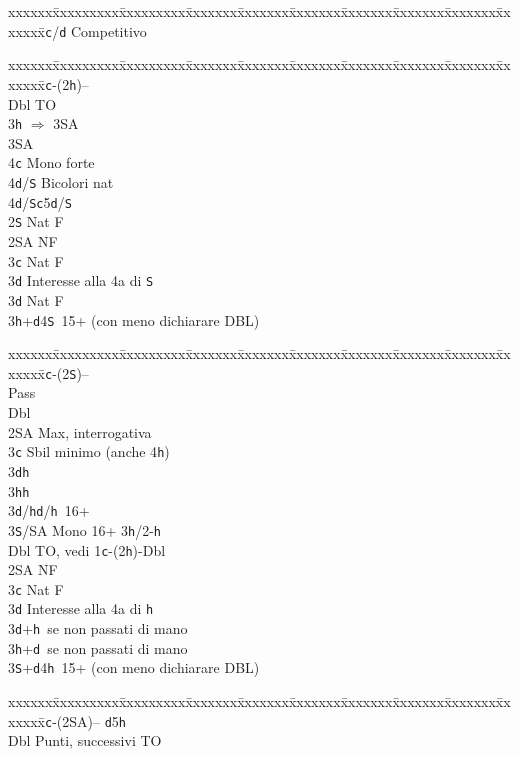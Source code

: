 \documentclass[a4paper,italian]{article}
\newcommand{\BS}{\small{\texttt{S}}}
\newcommand{\BC}{\small{\texttt{c}}}
\newcommand{\BD}{\small{\texttt{d}}}
\newcommand{\BH}{\small{\texttt{h}}}
\newenvironment{bidtable}
{\begin{tabbing}

    xxxxxx\=xxxxxxxxx\=xxxxxxxxx\=xxxxxxx\=xxxxxxx\=xxxxxxx\=xxxxxxx\=xxxxxxx\=xxxxxxx\=xxxxxxx\=\kill}
{\end{tabbing} }%
\begin{document}
\begin{multicols}{2}
\begin{bidtable}
        3\BC/\BD \> Competitivo\-
    \end{bidtable}
    \begin{bidtable}
        1\BC-(2\BH)--\+\\
        Dbl \> TO\+\\
        3\BH\> $\Rightarrow$ 3\small{SA}\+\\
        3\small{SA}\+\\
        4\BC\> Mono forte\\
        4\BD/\BS\> Bicolori nat \-\-\\
        4\BD/\BS{}\BC5\BD/\BS\-\\
        2\BS \> Nat F\\
        2\small{SA} \> NF\\
        3\BC \> Nat F\+\\
        3\BD \> Interesse alla 4a di \BS \-\\
        3\BD \> Nat F\\
        3\BH {}+\BD 4\BS\ 15+ (con meno dichiarare DBL)\-
    \end{bidtable}
    \begin{bidtable}
        1\BC-(2\BS)--\+\\
        Pass\+\\
        Dbl\+\\
        2\small{SA}\> Max, interrogativa\+\\
        3\BC\> Sbil minimo (anche 4\BH)\+\\
        3\BD{}\BH\\
        3\BH{}\BH\-\\
        3\BD/\BH{}\BD/\BH\ 16+\\
        3\BS/SA\> Mono 16+ 3\BH/2-\BH\-\-\-\\
        Dbl \> TO, vedi 1\BC-(2\BH)-Dbl\\
        2\small{SA} \> NF\\
        3\BC \> Nat F\+\\
        3\BD \> Interesse alla 4a di \BH \-\\
        3\BD {}+\BH\ se non passati di mano\\
        3\BH {}+\BD\ se non passati di mano\\
        3\BS {}+\BD 4\BH\ 15+ (con meno dichiarare DBL)\-
    \end{bidtable}
    \begin{bidtable}
        1\BC-(2\small{SA})-- \> \BD 5\BH \+\\
        Dbl \> Punti, successivi TO\\

\end{bidtable}
\end{multicols}
\end{document}
